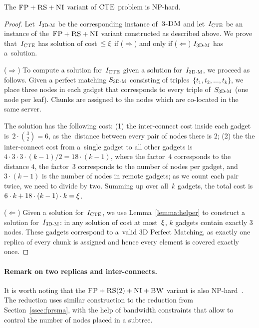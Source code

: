\begin{theorem}
\label{theorem:fp_rs_cc}
The $\textsc{FP}+\textsc{RS}+\textsc{NI}$ variant of $\textsc{CTE}$ problem is NP-hard.
\end{theorem}
\begin{proof}
Let~$I_{\mathrm{\textsc{3D-M}}}$ be the corresponding instance of~$\textsc{3-DM}$ and let~$I_{\mathrm{\textsc{CTE}}}$ be an instance of
the~$\textsc{FP}+\textsc{RS}+\textsc{NI}$ variant constructed as described above.
We prove that~$I_{\mathrm{\textsc{CTE}}}$ has solution of cost~$\leq \xi$ if ($\Rightarrow$) and only if
($\Leftarrow$)
$I_{\mathrm{\textsc{3D-M}}}$ has a~solution.

($\Rightarrow$) To compute a solution
for~$I_{\mathrm{\textsc{CTE}}}$ given a solution for~$I_{\mathrm{\textsc{3D-M}}}$, we proceed as follows.
Given a perfect matching $S_{\mathrm{\textsc{3D-M}}}$ consisting of triples~$ \{t_1, t_2,
\ldots, t_k\}$, we place three nodes in each gadget that
corresponds to every triple of~$S_{\mathrm{\textsc{3D-M}}}$ (one node per leaf). Chunks are assigned to the nodes which are co-located
in the same server.

The solution has the following cost:
(1) the inter-connect cost inside each gadget is~${2 \cdot {3 \choose 2} = 6}$,
  as the~distance between every pair of nodes there is $2$;
  (2) the the inter-connect cost from a~single gadget to all other gadgets is~$4
  \cdot 3 \cdot 3 \cdot (k - 1) / 2 = 18\cdot (k-1)$, where the factor~$4$ corresponds to the distance $4$, the factor~$3$
  corresponds to the number of nodes per gadget, and
 ~$3 \cdot (k-1)$ is the number of nodes in remote gadgets;
  as we count each pair twice, we need to divide by two.
Summing up over all~$k$ gadgets, the total cost is $6\cdot k + 18\cdot(k-1)\cdot k = \xi$.

($\Leftarrow$) Given a solution for~$I_{\mathrm{\textsc{CTE}}}$,
we use Lemma~\ref{lemma:helper} to construct a solution for~$I_{\mathrm{\textsc{3D-M}}}$: in any solution of cost at most~$\xi$,
$k$ gadgets contain exactly 3 nodes. These gadgets correspond to a~valid
3D Perfect Matching, as exactly one replica of every chunk is assigned and
hence every element is covered exactly once.
\end{proof}

\paragraph{Remark on two replicas and inter-connects.}
It is worth noting that the $\textsc{FP}+\textsc{RS}(2)+\textsc{NI}+\textsc{BW}$ variant is also NP-hard~\cite{my-tcs}.
The reduction uses similar construction to the reduction from Section~\ref{ssec:fprsma},
with the help of bandwidth constraints that allow to control the number of nodes placed in a subtree.

